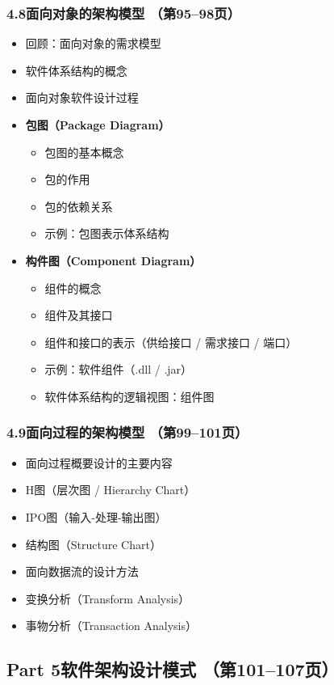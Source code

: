 \documentclass[12pt,a4paper]{ctexart}
\begin{document}
\subsubsection{4.8\quad 面向对象的架构模型 \hfill（第95--98页）}
\begin{itemize}
    \item 回顾：面向对象的需求模型
    \item 软件体系结构的概念
    \item 面向对象软件设计过程
    \item \textbf{包图（Package Diagram）}
    \begin{itemize}
        \item 包图的基本概念
        \item 包的作用
        \item 包的依赖关系
        \item 示例：包图表示体系结构
    \end{itemize}
    \item \textbf{构件图（Component Diagram）}
    \begin{itemize}
        \item 组件的概念
        \item 组件及其接口
        \item 组件和接口的表示（供给接口 / 需求接口 / 端口）
        \item 示例：软件组件（.dll / .jar）
        \item 软件体系结构的逻辑视图：组件图
    \end{itemize}
\end{itemize}

\subsubsection{4.9\quad 面向过程的架构模型 \hfill（第99--101页）}
\begin{itemize}
    \item 面向过程概要设计的主要内容
    \item H图（层次图 / Hierarchy Chart）
    \item IPO图（输入-处理-输出图）
    \item 结构图（Structure Chart）
    \item 面向数据流的设计方法
    \item 变换分析（Transform Analysis）
    \item 事物分析（Transaction Analysis）
\end{itemize}

\subsection{Part 5\quad 软件架构设计模式 \hfill（第101--107页）}
\end{document}
